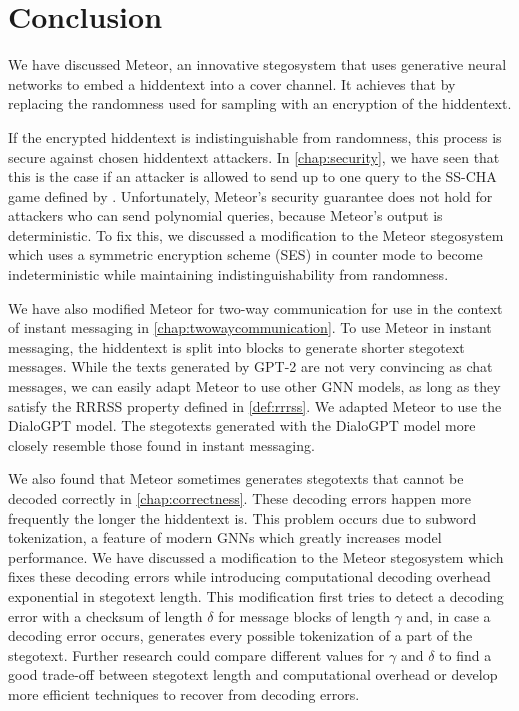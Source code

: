 \chapter{Conclusion}
\label{chap:conclusion}

We have discussed Meteor, an innovative stegosystem that uses generative neural networks to embed a hiddentext into a cover channel.
It achieves that by replacing the randomness used for sampling with an encryption of the hiddentext.

If the encrypted hiddentext is indistinguishable from randomness, this process is secure against chosen hiddentext attackers.
In \autoref{chap:security}, we have seen that this is the case if an attacker is allowed to send up to one query to the SS-CHA game defined by \cite{Hopper2004}.
Unfortunately, Meteor's security guarantee does not hold for attackers who can send polynomial queries, because Meteor's output is deterministic.
To fix this, we discussed a modification to the Meteor stegosystem which uses a symmetric encryption scheme (SES) in counter mode to become indeterministic while maintaining indistinguishability from randomness.

We have also modified Meteor for two-way communication for use in the context of instant messaging in \autoref{chap:twowaycommunication}.
To use Meteor in instant messaging, the hiddentext is split into blocks to generate shorter stegotext messages.
While the texts generated by GPT-2 are not very convincing as chat messages, we can easily adapt Meteor to use other GNN models, as long as they satisfy the RRRSS property defined in \autoref{def:rrrss}.
We adapted Meteor to use the DialoGPT model.
The stegotexts generated with the DialoGPT model more closely resemble those found in instant messaging.

We also found that Meteor sometimes generates stegotexts that cannot be decoded correctly in \autoref{chap:correctness}.
These decoding errors happen more frequently the longer the hiddentext is.
This problem occurs due to subword tokenization, a feature of modern GNNs which greatly increases model performance.
We have discussed a modification to the Meteor stegosystem which fixes these decoding errors while introducing computational decoding overhead exponential in stegotext length.
This modification first tries to detect a decoding error with a checksum of length $\delta$ for message blocks of length $\gamma$ and, in case a decoding error occurs, generates every possible tokenization of a part of the stegotext.
Further research could compare different values for $\gamma$ and $\delta$ to find a good trade-off between stegotext length and computational overhead or develop more efficient techniques to recover from decoding errors.

